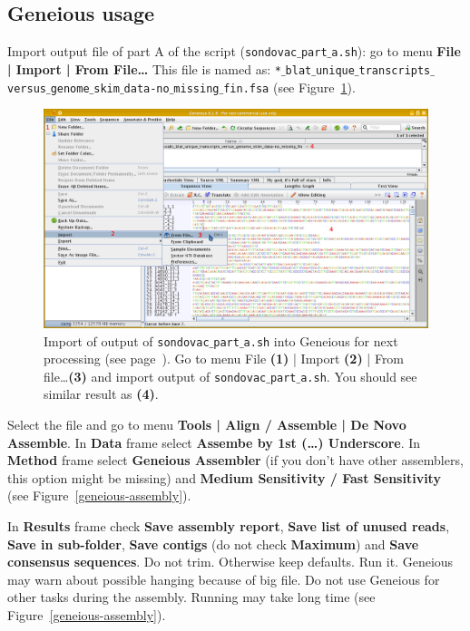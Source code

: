 \documentclass[a4paper, 11pt, twoside]{article}
\begin{document}
\subsection{Geneious usage}
\label{geneious-usage}

Import output file of part A of the script (\texttt{sondovac$\_$part$\_$a.sh}): go to menu \textbf{File | Import | From File\ldots} This file is named as: \texttt{*$\_$\allowbreak blat$\_$\allowbreak unique$\_$\allowbreak transcripts$\_$\allowbreak versus$\_$\allowbreak genome$\_$\allowbreak skim$\_$\allowbreak data-no$\_$\allowbreak missing$\_$\allowbreak fin.fsa} (see Figure~\ref{geneious-import}).

\begin{figure}[htb]
  \includegraphics[width=\textwidth]{geneious1.png}
  \caption[Import into Geneious]{Import of output of \texttt{sondovac$\_$part$\_$a.sh} into Geneious for next processing (see page~\pageref{pipeline-overview}). Go to menu File \textbf{(1)} | Import \textbf{(2)} | From file\ldots \textbf{(3)} and import output of \texttt{sondovac$\_$part$\_$a.sh}. You should see similar result as \textbf{(4)}.}
  \label{geneious-import}
\end{figure}

Select the file and go to menu \textbf{Tools | Align / Assemble | De Novo Assemble}. In \textbf{Data} frame select \textbf{Assembe by 1st (\ldots) Underscore}. In \textbf{Method} frame select \textbf{Geneious Assembler} (if you don't have other assemblers, this option might be missing) and \textbf{Medium Sensitivity / Fast Sensitivity} (see Figure~\ref{geneious-assembly}).

In \textbf{Results} frame check \textbf{Save assembly report}, \textbf{Save list of unused reads}, \textbf{Save in sub-folder}, \textbf{Save contigs} (do not check \textbf{Maximum}) and \textbf{Save consensus sequences}. Do not trim. Otherwise keep defaults. Run it. Geneious may warn about possible hanging because of big file. Do not use Geneious for other tasks during the assembly. Running may take long time (see Figure~\ref{geneious-assembly}).
\end{document}
